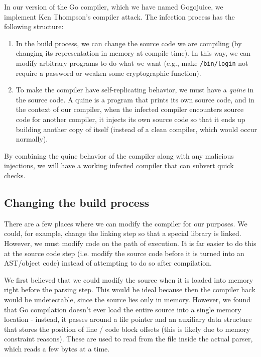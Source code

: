 \documentclass[10pt]{sigplanconf}
\begin{document}
In our version of the Go compiler, which we have named Gogojuice, we implement Ken Thompson's compiler attack. The infection process has the following structure:

\begin{enumerate}
\item In the build process, we can change the source code we are compiling (by changing its representation in memory at compile time). In this way, we can modify arbitrary programs to do what we want (e.g., make \texttt{/bin/login} not require a password or weaken some cryptographic function).
\item To make the compiler have self-replicating behavior, we must have a \emph{quine} in the source code. A quine is a program that prints its own source code, and in the context of our compiler, when the infected compiler encounters source code for another compiler, it injects its own source code so that it ends up building another copy of itself (instead of a clean compiler, which would occur normally).
\end{enumerate}

By combining the quine behavior of the compiler along with any malicious injections, we will have a working infected compiler that can subvert quick checks.

\subsection{Changing the build process}
There are a few places where we can modify the compiler for our purposes. We could, for example, change the linking step so that a special library is linked. However, we must modify code on the path of execution. It is far easier to do this at the source code step (i.e. modify the source code before it is turned into an AST/object code) instead of attempting to do so after compilation. 

\smallskip

We first believed that we could modify the source when it is loaded into memory right before the parsing step. This would be ideal because then the compiler hack would be undetectable, since the source lies only in memory. However, we found that Go compilation doesn't ever load the entire source into a single memory location - instead, it passes around a file pointer and an auxiliary data structure that stores the position of line / code block offsets (this is likely due to memory constraint reasons). These are used to read from the file inside the actual parser, which reads a few bytes at a time.
\end{document}
